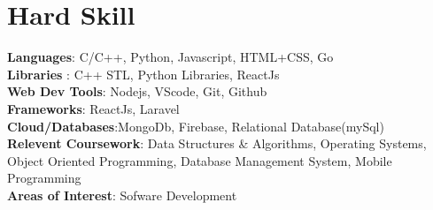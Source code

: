 \documentclass[a4paper,11pt]{article}
\begin{document}
\section{\textbf{Hard Skill}}
\begin{itemize}[leftmargin=0.05in, label={}]
  \small{\item{
        \textbf{Languages}{: C/C++, Python, Javascript, HTML+CSS, Go } \\
        \textbf{Libraries }{: C++ STL, Python Libraries, ReactJs }\\
        \textbf{Web Dev Tools}{: Nodejs, VScode, Git, Github } \\
        \textbf{Frameworks}{: ReactJs, Laravel} \\
        \textbf{Cloud/Databases}{:MongoDb, Firebase, Relational Database(mySql) } \\

        \textbf{Relevent Coursework}{: Data Structures \& Algorithms, Operating Systems, Object Oriented Programming, Database Management System, Mobile Programming } \\
        \textbf{Areas of Interest}{: Sofware Development} \\
        }}
\end{itemize}
\vspace{-16pt}
\end{document}
